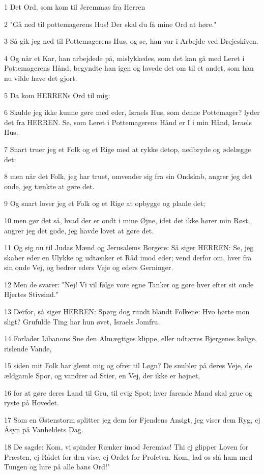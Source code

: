 \par 1 Det Ord, som kom til Jeremmas fra Herren
\par 2 "Gå ned til pottemagerens Hus! Der skal du få mine Ord at høre."
\par 3 Så gik jeg ned til Pottemagerens Hus, og se, han var i Arbejde ved Drejeskiven.
\par 4 Og når et Kar, han arbejdede på, mislykkedes, som det kan gå med Leret i Pottemagerens Hånd, begyndte han igen og lavede det om til et andet, som han nu vilde have det gjort.
\par 5 Da kom HERRENs Ord til mig:
\par 6 Skulde jeg ikke kunne gøre med eder, Israels Hus, som denne Pottemager? lyder det fra HERREN. Se, som Leret i Pottemagerens Hånd er I i min Hånd, Israels Hus.
\par 7 Snart truer jeg et Folk og et Rige med at rykke detop, nedbryde og ødelægge det;
\par 8 men når det Folk, jeg har truet, omvender sig fra sin Ondskab, angrer jeg det onde, jeg tænkte at gøre det.
\par 9 Og snart lover jeg et Folk og et Rige at opbygge og planle det;
\par 10 men gør det så, hvad der er ondt i mine Øjne, idet det ikke hører min Røst, angrer jeg det gode, jeg havde lovet at gøre det.
\par 11 Og sig nu til Judas Mænd og Jerusalems Borgere: Så siger HERREN: Se, jeg skaber eder en Ulykke og udtænker et Råd imod eder; vend derfor om, hver fra sin onde Vej, og bedrer eders Veje og eders Gerninger.
\par 12 Men de svarer: "Nej! Vi vil følge vore egne Tanker og gøre hver efter sit onde Hjertes Stivsind."
\par 13 Derfor, så siger HERREN: Spørg dog rundt blandt Folkene: Hvo hørte mon sligt? Grufulde Ting har hun øvet, Israels Jomfru.
\par 14 Forlader Libanons Sne den Almægtiges klippe, eller udtørres Bjergenes kølige, rislende Vande,
\par 15 siden mit Folk har glemt mig og ofrer til Løgn? De snubler på deres Veje, de ældgamle Spor, og vandrer ad Stier, en Vej, der ikke er højnet,
\par 16 for at gøre deres Land til Gru, til evig Spot; hver farende Mand skal grue og ryste på Hovedet.
\par 17 Som en Østenstorm splitter jeg dem for Fjendens Ansigt, jeg viser dem Ryg, ej Åsyn på Vanheldets Dag.
\par 18 De sagde: Kom, vi spinder Rænker imod Jeremias! Thi ej glipper Loven for Præsten, ej Rådet for den vise, ej Ordet for Profeten. Kom, lad os slå ham med Tungen og lure på alle hans Ord!"
